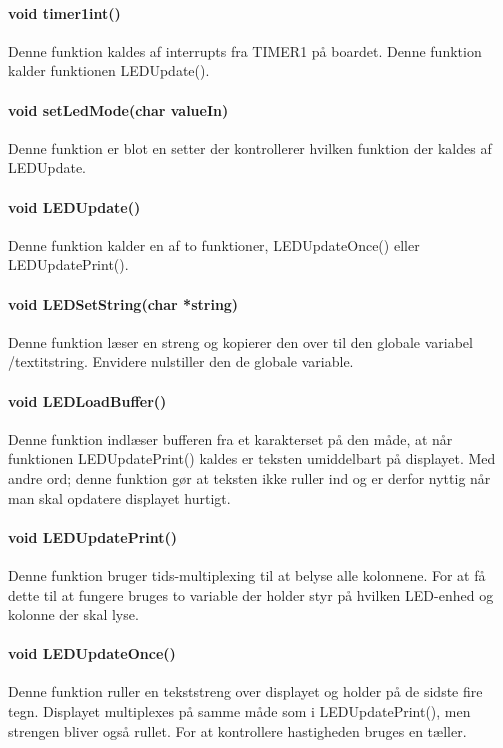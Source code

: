 \paragraph{void timer1int()}
Denne funktion kaldes af interrupts fra TIMER1 på boardet. Denne funktion kalder funktionen LEDUpdate().

\paragraph{void setLedMode(char valueIn)}
Denne funktion er blot en setter der kontrollerer hvilken funktion der kaldes af LEDUpdate.

\paragraph{void LEDUpdate()}
Denne funktion kalder en af to funktioner, LEDUpdateOnce() eller LEDUpdatePrint().

\paragraph{void LEDSetString(char *string)}
Denne funktion læser en streng  og kopierer den over til den globale variabel /textit{string}. Envidere nulstiller den de globale variable.

\paragraph{void LEDLoadBuffer()}
Denne funktion indlæser bufferen fra et karakterset på den måde, at når funktionen LEDUpdatePrint() kaldes er teksten umiddelbart på displayet. Med andre ord; denne funktion gør at teksten ikke ruller ind og er derfor nyttig når man skal opdatere displayet hurtigt.

\paragraph{void LEDUpdatePrint()}
Denne funktion bruger tids-multiplexing til at belyse alle kolonnene. For at få dette til at fungere bruges to variable der holder styr på hvilken LED-enhed og kolonne der skal lyse.

\paragraph{void LEDUpdateOnce()}
Denne funktion ruller en tekststreng over displayet og holder på de sidste fire tegn. Displayet multiplexes på samme måde som i LEDUpdatePrint(), men strengen bliver også rullet. For at kontrollere hastigheden bruges en tæller.



